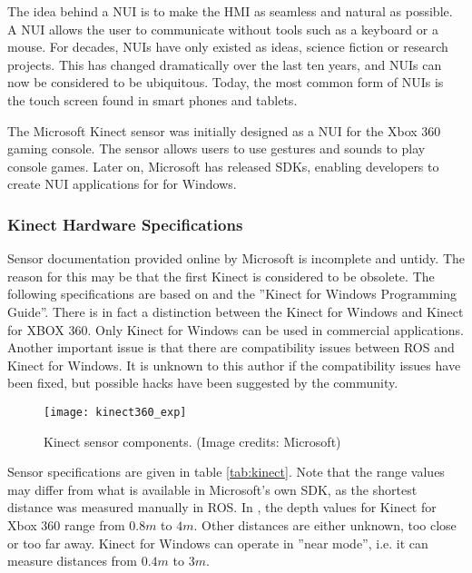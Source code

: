 The idea behind a \ac{NUI} is to make the \ac{HMI} as seamless and natural as possible. A \ac{NUI} allows the user to communicate without tools such as a keyboard or a mouse. For decades, \ac{NUI}s have only existed as ideas, science fiction or research projects. This has changed dramatically over the last ten years, and \ac{NUI}s can now be considered to be ubiquitous. Today, the most common form of \ac{NUI}s is the touch screen found in smart phones and tablets. 

The Microsoft Kinect sensor was initially designed as a \ac{NUI} for the Xbox 360 gaming console. The sensor allows users to use gestures and sounds to play console games. Later on, Microsoft has released SDKs, enabling developers to create \ac{NUI} applications for for Windows. 

\subsubsection{Kinect Hardware Specifications}

Sensor documentation provided online by Microsoft is incomplete and untidy. The reason for this may be that the first Kinect is considered to be obsolete. The following specifications are based on \cite{kinect_book} and the ''Kinect for Windows Programming Guide''\cite{kinect_guide}. There is in fact a distinction between the Kinect for Windows and Kinect for XBOX 360. Only Kinect for Windows can be used in commercial applications\cite{kinect_book}. Another important issue is that there are compatibility issues between \ac{ROS} and Kinect for Windows. It is unknown to this author if the compatibility issues have been fixed, but possible hacks have been suggested by the community\cite{kinect_discussion}\cite{kinect_hack}.

\begin{figure}[h]
    \centering
    \texttt{[image: kinect360\_exp]}
    \caption{Kinect sensor components. (Image credits: Microsoft\cite{kinect_guide})}
    \label{fig:kinect360_exp}
\end{figure}
Sensor specifications are given in table \ref{tab:kinect}. Note that the range values may differ from what is available in Microsoft's own SDK, as the shortest distance was measured manually in \ac{ROS}. In \cite{kinect_guide}, the depth values for Kinect for Xbox 360 range from $0.8 m$ to $4 m$. Other distances are either unknown, too close or too far away. Kinect for Windows can operate in ''near mode'', i.e. it can measure distances from $0.4 m$ to $3 m$.

